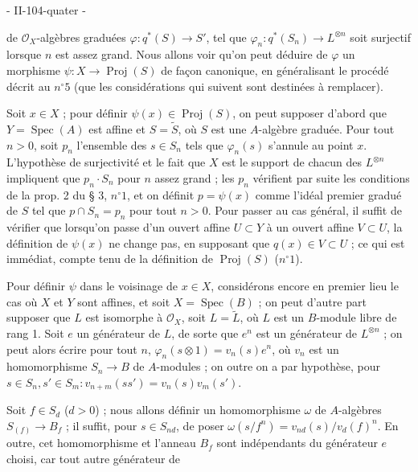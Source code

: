 \newpage


- II-104-quater -

de $\mathcal{O}_X$-algèbres graduées $\varphi : q^*(S) \to S'$, tel que $\varphi_n : q^*(S_n) \to L^{\otimes n}$ soit surjectif lorsque $n$ est assez grand. Nous allons voir qu'on peut déduire de $\varphi$ un morphisme $\psi : X \to \operatorname{Proj}(S)$ de façon canonique, en généralisant le procédé décrit au $n^\circ 5$ (que les considérations qui suivent sont destinées à remplacer).

Soit $x \in X$ ; pour définir $\psi(x) \in \operatorname{Proj}(S)$, on peut supposer d'abord que $Y = \operatorname{Spec}(A)$ est affine et $S = \tilde{S}$, où $S$ est une $A$-algèbre graduée. Pour tout $n > 0$, soit $p_n$ l'ensemble des $s \in S_n$ tels que $\varphi_n(s)$ s'annule au point $x$. L'hypothèse de surjectivité et le fait que $X$ est le support de chacun des $L^{\otimes n}$ impliquent que $p_n \cdot S_n$ pour $n$ assez grand ; les $p_n$ vérifient par suite les conditions de la prop. 2 du § 3, $n^\circ 1$, et on définit $p = \psi(x)$ comme l'idéal premier gradué de $S$ tel que $p \cap S_n = p_n$ pour tout $n > 0$. Pour passer au cas général, il suffit de vérifier que lorsqu'on passe d'un ouvert affine $U \subset Y$ à un ouvert affine $V \subset U$, la définition de $\psi(x)$ ne change pas, en supposant que $q(x) \in V \subset U$ ; ce qui est immédiat, compte tenu de la définition de $\operatorname{Proj}(S)$ ($n^\circ 1$).

Pour définir $\psi$ dans le voisinage de $x \in X$, considérons encore en premier lieu le cas où $X$ et $Y$ sont affines, et soit $X = \operatorname{Spec}(B)$ ; on peut d'autre part supposer que $L$ est isomorphe à $\mathcal{O}_X$, soit $L = \tilde{L}$, où $L$ est un $B$-module libre de rang 1. Soit $e$ un générateur de $L$, de sorte que $e^n$ est un générateur de $L^{\otimes n}$ ; on peut alors écrire pour tout $n$, $\varphi_n(s \otimes 1) = v_n(s) e^n$, où $v_n$ est un homomorphisme $S_n \to B$ de $A$-modules ; on outre on a par hypothèse, pour $s \in S_n, s' \in S_m : v_{n+m}(ss') = v_n(s)v_m(s')$.

Soit $f \in S_d$ ($d > 0$) ; nous allons définir un homomorphisme $\omega$ de $A$-algèbres $S_{(f)} \to B_f$ ; il suffit, pour $s \in S_{nd}$, de poser $\omega(s/f^n) = v_{nd}(s)/v_d(f)^n$. En outre, cet homomorphisme et l'anneau $B_f$ sont indépendants du générateur $e$ choisi, car tout autre générateur de


